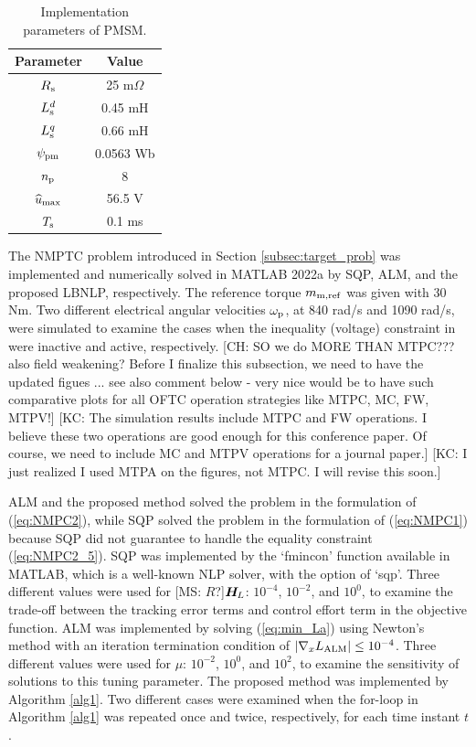 \documentclass[journal]{IEEEtranTIE}
\newcommand{\CHHA}[1]{{\color{red} [CH: #1]}} %
\newcommand{\KYCH}[1]{{\color{blue} [KC: #1]}} %
\newcommand{\MSRY}[1]{{\color{magenta} [MS: #1]}} %
\begin{document}
\begin{table}
\caption{Implementation parameters of PMSM.}\label{tab:Comparison of LBNLP, SQP and ALM}
\centering
{\begin{tabular}{cc}\hline
Parameter & Value \\\hline\hline
\rowcolor{lightgray}
$R_{\mathrm{s}}$ & 25 m$\Omega$\\
$L_{\mathrm{s}}^{d}$ & 0.45 mH\\
\rowcolor{lightgray}
$L_{\mathrm{s}}^{q}$ & 0.66 mH\\
$\psi_{\mathrm{pm}}$ & 0.0563 Wb\\
\rowcolor{lightgray}
$n_{\mathrm{p}}$ & 8\\
$\widehat{u}_{\max}$ & 56.5 V \\
\rowcolor{lightgray}
$T_{\mathrm{s}}$ & 0.1 ms \\\hline
\end{tabular}}
\end{table}



The NMPTC problem introduced in Section \ref{subsec:target_prob} was implemented and numerically solved in MATLAB 2022a by SQP, ALM, and the proposed LBNLP, respectively. The reference torque $m_{\mathrm{m},\mathrm{ref}}$ was given with 30 Nm. Two different electrical angular velocities $\omega_{\mathrm{p}}$, at 840 rad/s and 1090 rad/s, were simulated to examine the cases when the inequality (voltage) constraint in were inactive and active, respectively. \CHHA{SO we do MORE THAN MTPC??? also field weakening? Before I finalize this subsection, we need to have the updated figues ... see also comment below - very nice would be to have such comparative plots for all OFTC operation strategies like MTPC, MC, FW, MTPV!}
\KYCH{The simulation results include MTPC and FW operations. I believe these two operations are good enough for this conference paper. Of course, we need to include MC and MTPV operations for a journal paper.}
\KYCH{I just realized I used MTPA on the figures, not MTPC. I will revise this soon.}

ALM and the proposed method solved the problem in the formulation of (\ref{eq:NMPC2}), while SQP solved the problem in the formulation of (\ref{eq:NMPC1}) because SQP did not guarantee to handle the equality constraint (\ref{eq:NMPC2_5}). SQP was implemented by the `fmincon' function available in MATLAB, which is a well-known NLP solver, with the option of `sqp'. Three different values were used for 
\MSRY{$R$?}$\boldsymbol{H}_{\!L}$: $10^{-4}$, $10^{-2}$, and $10^{0}$, to examine the trade-off between the tracking error terms and control effort term in the objective function. ALM was implemented by solving (\ref{eq:min_La}) using Newton's method with an iteration termination condition of $\left| \nabla_x L_{\rm ALM} \right| \le 10^{-4}$. Three different values were used for $\mu$: $10^{-2}$, $10^{0}$, and $10^{2}$, to examine the sensitivity of solutions to this tuning parameter. The proposed method was implemented by Algorithm \ref{alg1}. Two different cases were examined when the for-loop in Algorithm \ref{alg1} was repeated once and twice, respectively, for each time instant $t$.
\end{document}
